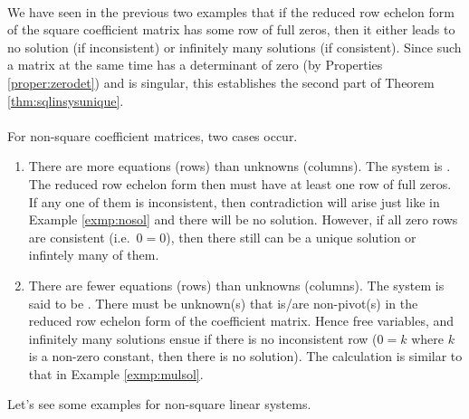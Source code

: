 \\
We have seen in the previous two examples that if the reduced row echelon form of the square coefficient matrix has some row of full zeros, then it either leads to no solution (if inconsistent) or infinitely many solutions (if consistent). Since such a matrix at the same time has a determinant of zero (by Properties \ref{proper:zerodet}) and is singular, this establishes the second part of Theorem \ref{thm:sqlinsysunique}. \\
\\
For non-square coefficient matrices, two cases occur.
\begin{enumerate}
\item There are more equations (rows) than unknowns (columns). The system is . The reduced row echelon form then must have at least one row of full zeros. If any one of them is inconsistent, then contradiction will arise just like in Example \ref{exmp:nosol} and there will be no solution. However, if all zero rows are consistent (i.e.\ $0=0$), then there still can be a unique solution or infintely many of them.
\item There are fewer equations (rows) than unknowns (columns). The system is said to be . There must be unknown(s) that is/are non-pivot(s) in the reduced row echelon form of the coefficient matrix. Hence free variables, and infinitely many solutions ensue if there is no inconsistent row ($0 = k$ where $k$ is a non-zero constant, then there is no solution). The calculation is similar to that in Example \ref{exmp:mulsol}.
\end{enumerate}
Let's see some examples for non-square linear systems.\

